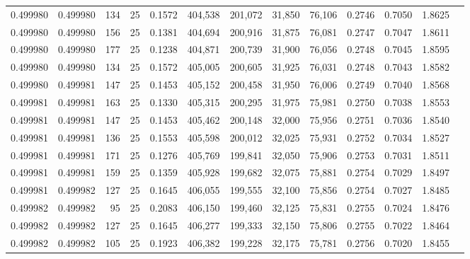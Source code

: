 \begin{tabular}{rrrrrrrrrrrrr}
0.499980 & 0.499980 &   134 &  25 &                                     0.1572 & 404,538 & 201,072 &  31,850 &  76,106 & 0.2746 & 0.7050 & 1.8625 \\
0.499980 & 0.499980 &   156 &  25 &                                     0.1381 & 404,694 & 200,916 &  31,875 &  76,081 & 0.2747 & 0.7047 & 1.8611 \\
0.499980 & 0.499980 &   177 &  25 &                                     0.1238 & 404,871 & 200,739 &  31,900 &  76,056 & 0.2748 & 0.7045 & 1.8595 \\
0.499980 & 0.499980 &   134 &  25 &                                     0.1572 & 405,005 & 200,605 &  31,925 &  76,031 & 0.2748 & 0.7043 & 1.8582 \\
0.499980 & 0.499981 &   147 &  25 &                                     0.1453 & 405,152 & 200,458 &  31,950 &  76,006 & 0.2749 & 0.7040 & 1.8568 \\
0.499981 & 0.499981 &   163 &  25 &                                     0.1330 & 405,315 & 200,295 &  31,975 &  75,981 & 0.2750 & 0.7038 & 1.8553 \\
0.499981 & 0.499981 &   147 &  25 &                                     0.1453 & 405,462 & 200,148 &  32,000 &  75,956 & 0.2751 & 0.7036 & 1.8540 \\
0.499981 & 0.499981 &   136 &  25 &                                     0.1553 & 405,598 & 200,012 &  32,025 &  75,931 & 0.2752 & 0.7034 & 1.8527 \\
0.499981 & 0.499981 &   171 &  25 &                                     0.1276 & 405,769 & 199,841 &  32,050 &  75,906 & 0.2753 & 0.7031 & 1.8511 \\
0.499981 & 0.499981 &   159 &  25 &                                     0.1359 & 405,928 & 199,682 &  32,075 &  75,881 & 0.2754 & 0.7029 & 1.8497 \\
0.499981 & 0.499982 &   127 &  25 &                                     0.1645 & 406,055 & 199,555 &  32,100 &  75,856 & 0.2754 & 0.7027 & 1.8485 \\
0.499982 & 0.499982 &    95 &  25 &                                     0.2083 & 406,150 & 199,460 &  32,125 &  75,831 & 0.2755 & 0.7024 & 1.8476 \\
0.499982 & 0.499982 &   127 &  25 &                                     0.1645 & 406,277 & 199,333 &  32,150 &  75,806 & 0.2755 & 0.7022 & 1.8464 \\
0.499982 & 0.499982 &   105 &  25 &                                     0.1923 & 406,382 & 199,228 &  32,175 &  75,781 & 0.2756 & 0.7020 & 1.8455 \\

\end{tabular}
